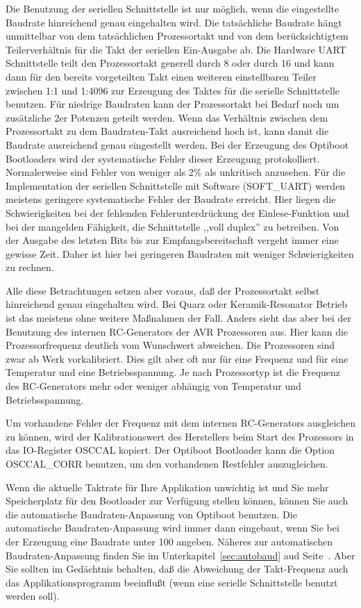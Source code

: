 Die Benutzung der seriellen Schnittstelle ist nur möglich, wenn die eingestellte Baudrate
hinreichend genau eingehalten wird. Die tatsächliche Baudrate hängt unmittelbar von dem tatsächlichen
Prozessortakt und von dem berücksichtigtem Teilerverhältnis für die Takt der seriellen Ein-Ausgabe ab.
Die Hardware UART Schnittstelle teilt den Prozessortakt generell durch 8 oder durch 16 und kann
dann für den bereits vorgeteilten Takt einen weiteren einstellbaren Teiler zwischen 1:1 und 1:4096  
zur Erzeugung des Taktes für die serielle Schnittstelle benutzen. Für niedrige Baudraten kann der
Prozessortakt bei Bedarf noch um zusätzliche 2er Potenzen geteilt werden.
Wenn das Verhältnis zwischen dem Prozessortakt zu dem Baudraten-Takt ausreichend hoch ist, kann damit
die Baudrate ausreichend genau eingestellt werden. Bei der Erzeugung des Optiboot Bootloaders
wird der systematische Fehler dieser Erzeugung protokolliert.
Normalerweise sind Fehler von weniger als 2\%  als unkritisch anzusehen.
Für die Implementation der seriellen Schnittstelle mit Software (SOFT\_UART) werden meistens geringere
systematische Fehler der Baudrate erreicht. Hier liegen die Schwierigkeiten bei der fehlenden
Fehlerunterdrückung der Einlese-Funktion und bei der mangelden Fähigkeit, die Schnittstelle
,,voll duplex'' zu betreiben. Von der Ausgabe des letzten Bits bis zur Empfangsbereitschaft vergeht immer
eine gewisse Zeit. Daher ist hier bei geringeren Baudraten mit weniger Schwierigkeiten zu rechnen.

Alle diese Betrachtungen setzen aber voraus, daß der Prozessortakt selbst hinreichend genau eingehalten wird.
Bei Quarz oder Keramik-Resonator Betrieb ist das meistens ohne weitere Maßnahmen der Fall.
Anders sieht das aber bei der Benutzung des internen RC-Generators der AVR Prozessoren aus.
Hier kann die Prozessorfrequenz deutlich vom Wunschwert abweichen. Die Prozessoren sind zwar ab Werk
vorkalibriert. Dies gilt aber oft nur für eine Frequenz und für eine Temperatur und eine Betriebsspannung.
Je nach Prozessortyp ist die Frequenz des RC-Generators mehr oder weniger abhängig von Temperatur
und Betriebsspannung.

Um vorhandene Fehler der Frequenz mit dem internen RC-Generators ausgleichen zu können,
wird der Kalibrationswert des Herstellers beim Start des Prozessors in das IO-Register OSCCAL kopiert.
Der Optiboot Bootloader kann die Option OSCCAL\_CORR benutzen, um den vorhandenen Restfehler
auszugleichen.

Wenn die aktuelle Taktrate für Ihre Applikation unwichtig ist und
Sie mehr Speicherplatz für den Bootloader zur Verfügung stellen können,
können Sie auch die automatische Baudraten-Anpassung von Optiboot benutzen.
Die automatische Baudraten-Anpassung wird immer dann eingebaut,
wenn Sie bei der Erzeugung eine Baudrate unter 100 angeben.
Näheres zur automatischen Baudraten-Anpassung finden Sie
im Unterkapitel~\ref{sec:autobaud} aud Seite~\pageref{sec:autobaud}.
Aber Sie sollten im Gedächtnis behalten, daß die Abweichung der Takt-Frequenz
auch das Applikationsprogramm beeinflußt (wenn eine serielle Schnittstelle benutzt werden soll).

